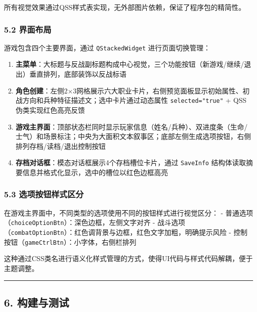 所有视觉效果通过QSS样式表实现，无外部图片依赖，保证了程序包的精简性。

\hypertarget{ux754cux9762ux5e03ux5c40}{%
\subsubsection{5.2 界面布局}\label{ux754cux9762ux5e03ux5c40}}

游戏包含四个主要界面，通过 \texttt{QStackedWidget} 进行页面切换管理：

\begin{enumerate}
\def\labelenumi{\arabic{enumi}.}
\tightlist
\item
  \textbf{主菜单}：大标题与反战副标题构成中心视觉，三个功能按钮（新游戏/继续/退出）垂直排列，底部装饰以反战标语
\item
  \textbf{角色创建}：左侧2×3网格展示六大职业卡片，右侧预览面板显示初始属性、初战方向和兵种特征描述文；选中卡片通过动态属性
  \texttt{selected="true"} + QSS伪类实现红色高亮反馈
\item
  \textbf{游戏主界面}：顶部状态栏同时显示玩家信息（姓名/兵种）、双进度条（生命/士气）和场景标注；中央为大面积文本叙事区；底部左侧生成选项按钮，右侧排列存档/读档/退出控制按钮
\item
  \textbf{存档对话框}：模态对话框展示4个存档槽位卡片，通过
  \texttt{SaveInfo}
  结构体读取摘要信息并格式化显示，选中的槽位以红色边框高亮
\end{enumerate}

\hypertarget{ux9009ux9879ux6309ux94aeux6837ux5f0fux533aux5206}{%
\subsubsection{5.3
选项按钮样式区分}\label{ux9009ux9879ux6309ux94aeux6837ux5f0fux533aux5206}}

在游戏主界面中，不同类型的选项使用不同的按钮样式进行视觉区分： -
普通选项（\texttt{choiceOptionBtn}）：深色边框，左侧文字对齐 -
战斗选项（\texttt{combatOptionBtn}）：红色调背景与边框，红色文字加粗，明确提示风险
- 控制按钮（\texttt{gameCtrlBtn}）：小字体，右侧栏排列

这种通过CSS类名进行语义化样式管理的方式，使得UI代码与样式代码解耦，便于主题调整。

\begin{center}\rule{0.5\linewidth}{0.5pt}\end{center}

\hypertarget{ux6784ux5efaux4e0eux6d4bux8bd5}{%
\subsection{6. 构建与测试}\label{ux6784ux5efaux4e0eux6d4bux8bd5}}

